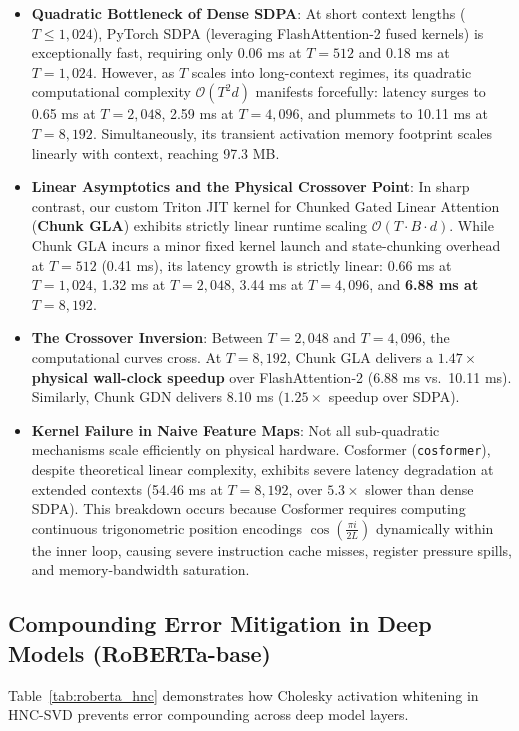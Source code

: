 \documentclass{article}
\begin{document}
\begin{itemize}
    \item \textbf{Quadratic Bottleneck of Dense SDPA}: At short context lengths ($T \le 1,024$), PyTorch SDPA (leveraging FlashAttention-2 fused kernels) is exceptionally fast, requiring only 0.06 ms at $T=512$ and 0.18 ms at $T=1,024$. However, as $T$ scales into long-context regimes, its quadratic computational complexity $\mathcal{O}(T^2 d)$ manifests forcefully: latency surges to 0.65 ms at $T=2,048$, 2.59 ms at $T=4,096$, and plummets to 10.11 ms at $T=8,192$. Simultaneously, its transient activation memory footprint scales linearly with context, reaching 97.3 MB.
    \item \textbf{Linear Asymptotics and the Physical Crossover Point}: In sharp contrast, our custom Triton JIT kernel for Chunked Gated Linear Attention (\textbf{Chunk GLA}) exhibits strictly linear runtime scaling $\mathcal{O}(T \cdot B \cdot d)$. While Chunk GLA incurs a minor fixed kernel launch and state-chunking overhead at $T=512$ (0.41 ms), its latency growth is strictly linear: 0.66 ms at $T=1,024$, 1.32 ms at $T=2,048$, 3.44 ms at $T=4,096$, and \textbf{6.88 ms at $T=8,192$}.
    \item \textbf{The Crossover Inversion}: Between $T=2,048$ and $T=4,096$, the computational curves cross. At $T=8,192$, Chunk GLA delivers a \textbf{$1.47\times$ physical wall-clock speedup} over FlashAttention-2 (6.88 ms vs.\ 10.11 ms). Similarly, Chunk GDN delivers 8.10 ms ($1.25\times$ speedup over SDPA).
    \item \textbf{Kernel Failure in Naive Feature Maps}: Not all sub-quadratic mechanisms scale efficiently on physical hardware. Cosformer (\texttt{cosformer}), despite theoretical linear complexity, exhibits severe latency degradation at extended contexts (54.46 ms at $T=8,192$, over $5.3\times$ slower than dense SDPA). This breakdown occurs because Cosformer requires computing continuous trigonometric position encodings $\cos\left(\frac{\pi i}{2 L}\right)$ dynamically within the inner loop, causing severe instruction cache misses, register pressure spills, and memory-bandwidth saturation.
\end{itemize}

\subsection{Compounding Error Mitigation in Deep Models (RoBERTa-base)}
Table~\ref{tab:roberta_hnc} demonstrates how Cholesky activation whitening in HNC-SVD prevents error compounding across deep model layers.
\end{document}
